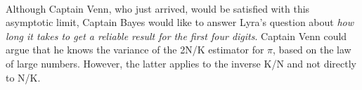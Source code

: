 \documentclass[12pt, a4paper]{scrartcl}
\begin{document}
\\

Although Captain Venn, who just arrived, would be satisﬁed with this
asymptotic limit, Captain Bayes would like to answer Lyra’s question about
\textit{how long it takes to get a reliable result for the ﬁrst four digits}. Captain
Venn could argue that he knows the variance of the 2N/K estimator for
$\pi$, based on the law of large numbers. However, the latter applies to the
inverse K/N and not directly to N/K. \\
\end{document}
